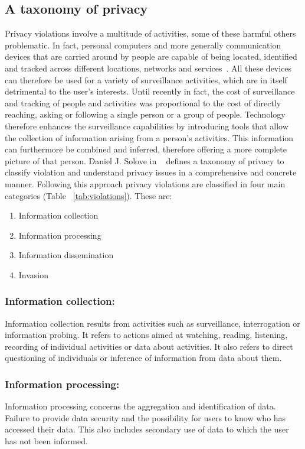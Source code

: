 \subsection{A taxonomy of privacy}

Privacy violations involve a multitude of activities, some of these harmful others problematic. In fact, personal computers and more generally communication devices that are carried around by people are capable of being located, identified and tracked across different locations, networks and services~\cite{michael2013location}. All these devices can therefore be used for a variety of surveillance activities, which are in itself detrimental to the user's interests. Until recently in fact, the cost of surveillance and tracking of people and activities was proportional to the cost of directly reaching, asking or following a single person or a group of people. Technology therefore enhances the surveillance capabilities by introducing tools that allow the collection of information arising from a person's activities. This information can furthermore be combined and inferred, therefore offering a more complete picture of that person. Daniel J. Solove in ~\cite{solove2006taxonomy} defines a taxonomy of privacy to classify violation and understand privacy issues in a comprehensive and concrete manner. Following this approach privacy violations are classified in four main categories (Table ~\ref{tab:violations}). These are: 

\begin{enumerate}
 \item Information collection
 \item Information processing
 \item Information dissemination
 \item Invasion
 \end{enumerate}
 
\subsubsection{Information collection:} 
Information collection results from activities such as surveillance, interrogation or information probing. It refers to actions aimed at watching, reading, listening, recording of individual activities or data about activities. It also refers to direct questioning of individuals or inference of information from data about them.
 
\subsubsection{Information processing:}
Information processing concerns the aggregation and identification of data. Failure to provide data security and the possibility for users to know who has accessed their data. This also includes secondary use of data to which the user has not been informed.
 
